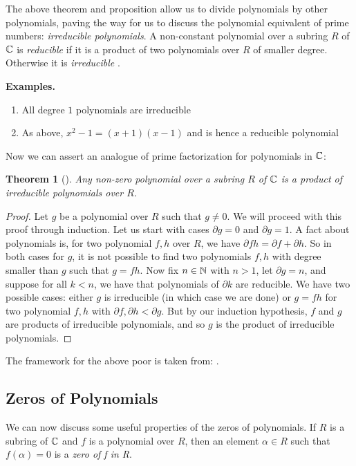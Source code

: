 \documentclass[11pt, a4paper, oneside]{article}
\theoremstyle{plain}
\newtheorem*{thm*}{Theorem}
\theoremstyle{plain}
\theoremstyle{plain}
\theoremstyle{plain}
\theoremstyle{definition}
\theoremstyle{example}
\begin{document}
The above theorem and proposition allow us to divide polynomials by other polynomials, paving the way for us to discuss the polynomial equivalent of prime numbers: \textit{irreducible polynomials}. A non-constant polynomial over a subring $R$ of $\mathbb{C}$ is \textit{reducible} if it is a product of two polynomials over $R$ of smaller degree. Otherwise it is \textit{irreducible} \cite[\S 3.2, p. 51]{stewart}.

\textbf{Examples.}
\begin{enumerate}
\item All degree $1$ polynomials are irreducible
\item As above, $x^2 - 1 = (x + 1)(x - 1)$ and is hence a reducible polynomial
\end{enumerate}

Now we can assert an analogue of prime factorization for polynomials in $\mathbb{C}$:

\begin{thm*}[{\cite[Thm.\ 3.12]{stewart}}] 
Any non-zero polynomial over a subring $R$ of $\mathbb{C}$ is a product of irreducible polynomials over $R$.
\end{thm*}

\begin{proof}
Let $g$ be a polynomial over $R$ such that $g \neq 0$. We will proceed with this proof through induction. Let us start with cases $\partial g = 0$ and $\partial g = 1$. A fact about polynomials is, for two polynomial $f, h$ over $R$, we have $\partial fh = \partial f + \partial h$. So in both cases for $g$, it is not possible to find two polynomials $f, h$ with degree smaller than $g$ such that $g = fh$. Now fix $n \in \mathbb{N}$ with $n > 1$, let $\partial g = n$, and suppose for all $k < n$, we have that polynomials of $\partial k$ are reducible. We have two possible cases: either $g$ is irreducible (in which case we are done) or $g = fh$ for two polynomial $f, h$ with $\partial f, \partial h < \partial g$. But by our induction hypothesis, $f$ and $g$ are products of irreducible polynomials, and so $g$ is the product of irreducible polynomials.
\end{proof}

The framework for the above poor is taken from: \cite[\S 3.2, p. 52]{stewart}.

\subsection{Zeros of Polynomials}

We can now discuss some useful properties of the zeros of polynomials. If $R$ is a subring of $\mathbb{C}$ and $f$ is a polynomial over $R$, then an element $\alpha \in R$ such that $f(\alpha) = 0$ is a \textit{zero of f in R}.
\end{document}

